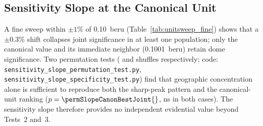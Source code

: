\documentclass[HARVARD,twocolumn]{USG}
\begin{document}
\subsection{Sensitivity Slope at the Canonical Unit}
\label{sec:sensitivity_slope_perm}

A fine sweep within $\pm 1\%$ of 0.10~beru (Table~\ref{tab:unitsweep_fine})
shows that a $\pm 0.3\%$ shift collapses joint significance in at least one
population; only the canonical value and its immediate neighbor (0.1001~beru)
retain dome significance. Two permutation tests (\permSlopeNperms{} and
\permSlopeSpecN{} shuffles respectively; code:
\texttt{sensitivity\_slope\_permutation\_test.py},
\texttt{sensitivity\_slope\_specificity\_test.py}) find that geographic
concentration alone is sufficient to reproduce both the sharp-peak pattern
and the canonical-unit ranking ($p = \permSlopeCanonBestJoint{}$, ns in both
cases). The sensitivity slope therefore provides no independent evidential
value beyond Tests~2 and~3.
\end{document}
